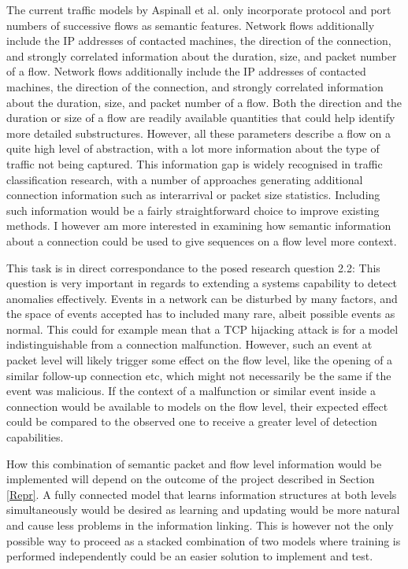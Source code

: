 \documentclass[a4paper,12pt,twoside]{report}
\begin{document}
The current traffic models by Aspinall et al. only incorporate protocol and port numbers of successive flows as semantic features. Network flows additionally include the IP addresses of contacted machines, the direction of the connection, and strongly correlated information about the duration, size, and packet number of a flow. Network flows additionally include the IP addresses of contacted machines, the direction of the connection, and strongly correlated information about the duration, size, and packet number of a flow. Both the direction and the duration or size of a flow are readily available quantities that could help identify more detailed substructures. However, all these parameters describe a flow on a quite high level of abstraction, with a lot more information about the type of traffic not being captured. This information gap is widely recognised in traffic classification research, with a number of approaches generating additional connection information such as interarrival or packet size statistics. Including such information would be a fairly straightforward choice to improve existing methods. I however am more interested in examining how semantic information about a connection could be used to give sequences on a flow level more context.

This task is in direct correspondance to the posed research question 2.2:  This question is very important in regards to extending a systems capability to detect anomalies effectively. Events in a network can be disturbed by many factors, and the space of events accepted has to included many rare, albeit possible events as normal. This could for example mean that a TCP hijacking attack is for a model indistinguishable from a connection malfunction. However, such an event at packet level will likely trigger some effect on the flow level, like the opening of a similar follow-up connection etc, which might not necessarily be the same if the event was malicious. If the context of a malfunction or similar event inside a connection would be available to models on the flow level, their expected effect could be compared to the observed one to receive a greater level of detection capabilities.


How this combination of semantic packet and flow level information would be implemented will depend on the outcome of the project described in Section \ref{Repr}. A fully connected model that learns information structures at both levels simultaneously would be desired as learning and updating would be more natural and cause less problems in the information linking. This is however not the only possible way to proceed as a stacked combination of two models where training is performed independently could be an easier solution to implement and test.
\end{document}
